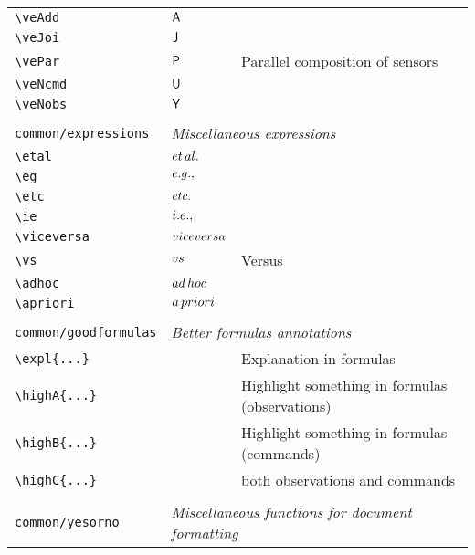\begin{longtable}{lll}
 {\color[rgb]{0.5,0.5,0.5}\texttt{\textbackslash veAdd}} & $\mathsf{A}$ & \\ 
 {\color[rgb]{0.5,0.5,0.5}\texttt{\textbackslash veJoi}} & $\mathsf{J}$ & \\ 
 {\color[rgb]{0.5,0.5,0.5}\texttt{\textbackslash vePar}} & $\mathsf{P}$ &  Parallel composition of sensors\\ 
 {\color[rgb]{0.5,0.5,0.5}\texttt{\textbackslash veNcmd}} & $\mathsf{U}$ & \\ 
 {\color[rgb]{0.5,0.5,0.5}\texttt{\textbackslash veNobs}} & $\mathsf{Y}$ & \\ 
  &  & \\ 
 {\color[rgb]{0.5,0.5,0.5}\texttt{common/expressions}} & \multicolumn{2}{l}{\emph{Miscellaneous expressions}}\\ 
 \hline
{\color[rgb]{0.5,0.5,0.5}\texttt{\textbackslash etal}} & ${et\,al.}$ & \\ 
 {\color[rgb]{0.5,0.5,0.5}\texttt{\textbackslash eg}} & ${e.g.},$ & \\ 
 {\color[rgb]{0.5,0.5,0.5}\texttt{\textbackslash etc}} & ${etc.}$ & \\ 
 {\color[rgb]{0.5,0.5,0.5}\texttt{\textbackslash ie}} & ${i.e.},$ & \\ 
 {\color[rgb]{0.5,0.5,0.5}\texttt{\textbackslash viceversa}} & ${vice versa}$ & \\ 
 {\color[rgb]{0.5,0.5,0.5}\texttt{\textbackslash vs}} & ${vs}$ &  Versus\\ 
 {\color[rgb]{0.5,0.5,0.5}\texttt{\textbackslash adhoc}} & ${ad\,hoc}$ & \\ 
 {\color[rgb]{0.5,0.5,0.5}\texttt{\textbackslash apriori}} & ${a\,priori}$ & \\ 
  &  & \\ 
 {\color[rgb]{0.5,0.5,0.5}\texttt{common/goodformulas}} & \multicolumn{2}{l}{\emph{Better formulas annotations}}\\ 
 \hline
{\color[rgb]{0.5,0.5,0.5}\texttt{\textbackslash expl\{...\}}} &  &  Explanation in formulas\\ 
 {\color[rgb]{0.5,0.5,0.5}\texttt{\textbackslash highA\{...\}}} &  &  Highlight something in formulas (observations)\\ 
 {\color[rgb]{0.5,0.5,0.5}\texttt{\textbackslash highB\{...\}}} &  &  Highlight something in formulas (commands)\\ 
 {\color[rgb]{0.5,0.5,0.5}\texttt{\textbackslash highC\{...\}}} &  &  both observations and commands\\ 
  &  & \\ 
 {\color[rgb]{0.5,0.5,0.5}\texttt{common/yesorno}} & \multicolumn{2}{l}{\emph{Miscellaneous functions for document formatting}}\\ 

\end{longtable}
